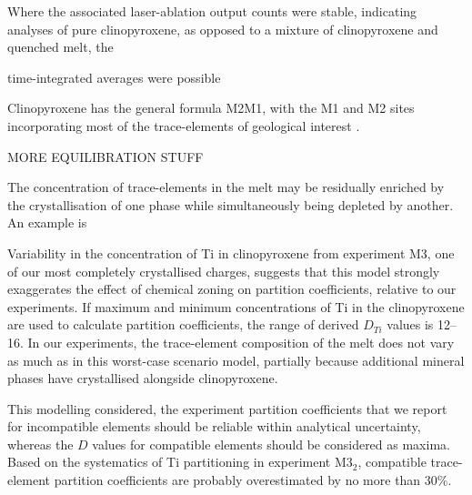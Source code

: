 
Where the associated laser-ablation output counts were stable, indicating analyses of pure clinopyroxene, as opposed to a mixture of clinopyroxene and quenched melt, the


time-integrated averages were possible



Clinopyroxene has the general formula M2M1, with the M1 and M2 sites incorporating most of the trace-elements of geological interest \citep{Morimoto1989}. 



MORE EQUILIBRATION STUFF


    The concentration of trace-elements in the melt may be residually enriched by the crystallisation of one phase while simultaneously being depleted by another. An example is 	

	
	Variability in the concentration of Ti in clinopyroxene from experiment M3, one of our most completely crystallised charges, suggests that this model strongly exaggerates the effect of chemical zoning on partition coefficients, relative to our experiments. If maximum and minimum concentrations of Ti in the clinopyroxene are used to calculate partition coefficients, the range of derived $D_{Ti}$ values is 12--16.	
 In our experiments, the trace-element composition of the melt does not vary as much as in this worst-case scenario model, partially because additional mineral phases have crystallised alongside clinopyroxene.

 This modelling considered, the experiment partition coefficients that we report for incompatible elements should be reliable within analytical uncertainty, whereas the $D$ values for compatible elements should be considered as maxima. Based on the systematics of Ti partitioning in experiment M$3_2$, compatible trace-element partition coefficients are probably overestimated by no more than 30\%.	
